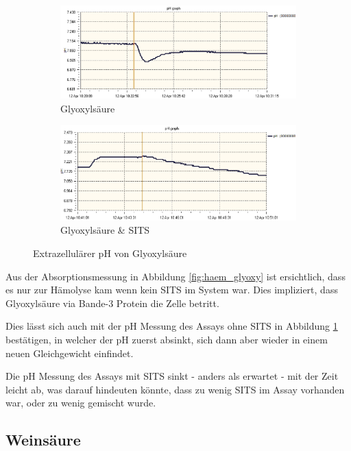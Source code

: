 \documentclass[a4paper,german]{scrreprt}
\begin{document}
\begin{figure}
	\centering
	\begin{subfigure}{.5\textwidth}
		\centering
		\includegraphics[width=\linewidth]{img/ph_glyoxy.png}
		\caption{Glyoxylsäure}
	\end{subfigure}%
	\begin{subfigure}{.5\textwidth}
		\centering
		\includegraphics[width=\linewidth]{img/ph_glyoxy_sits.png}
		\caption{Glyoxylsäure \& SITS}
	\end{subfigure}
	\caption{Extrazellulärer pH von Glyoxylsäure}
	\label{fig:ph_glyoxy}
\end{figure}

Aus der Absorptionsmessung in Abbildung \ref{fig:haem_glyoxy} ist ersichtlich,
dass es nur zur Hämolyse kam wenn kein SITS im System war. Dies impliziert,
dass Glyoxylsäure via Bande-3 Protein die Zelle betritt.

Dies lässt sich auch mit der pH Messung des Assays ohne SITS in Abbildung
\ref{fig:ph_glyoxy} bestätigen, in welcher der pH zuerst absinkt, sich dann
aber wieder in einem neuen Gleichgewicht einfindet.

Die pH Messung des Assays mit SITS sinkt - anders als erwartet - mit der Zeit
leicht ab, was darauf hindeuten könnte, dass zu wenig SITS im Assay vorhanden
war, oder zu wenig gemischt wurde.

\subsection{Weinsäure}
\end{document}

